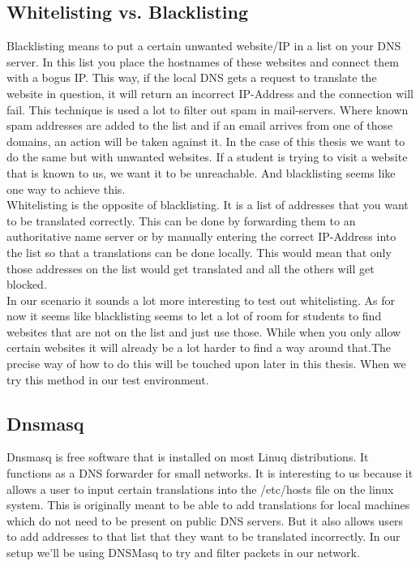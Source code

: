 \subsection{Whitelisting vs. Blacklisting}
Blacklisting means to put a certain unwanted website/IP in a list on your DNS server. In this list you place the hostnames of these websites and connect them with a bogus IP. This way, if the local DNS gets a request to translate the website in question, it will return an incorrect IP-Address and the connection will fail. This technique is used a lot to filter out spam in mail-servers. Where known spam addresses are added to the list and if an email arrives from one of those domains, an action will be taken against it. In the case of this thesis we want to do the same but with unwanted websites. If a student is trying to visit a website that is known to us, we want it to be unreachable. And blacklisting seems like one way to achieve this.\\
Whitelisting is the opposite of blacklisting. It is a list of addresses that you want to be translated correctly. This can be done by forwarding them to an authoritative name server or by manually entering the correct IP-Address into the list so that a translations can be done locally. This would mean that only those addresses on the list would get translated and all the others will get blocked.\\
In our scenario it sounds a lot more interesting to test out whitelisting. As for now it seems like blacklisting seems to let a lot of room for students to find websites that are not on the list and just use those. While when you only allow certain websites it will already be a lot harder to find a way around that.The precise way of how to do this will be touched upon later in this thesis. When we try this method in our test environment.
\subsection{Dnsmasq}
Dnsmasq is free software that is installed on most Linuq distributions. It functions as a DNS forwarder for small networks. It is interesting to us because it allows a user to input certain translations into the /etc/hosts file on the linux system. This is originally meant to be able to add translations for local machines which do not need to be present on public DNS servers. But it also allows users to add addresses to that list that they want to be translated incorrectly. In our setup we'll be using DNSMasq to try and filter packets in our network.
